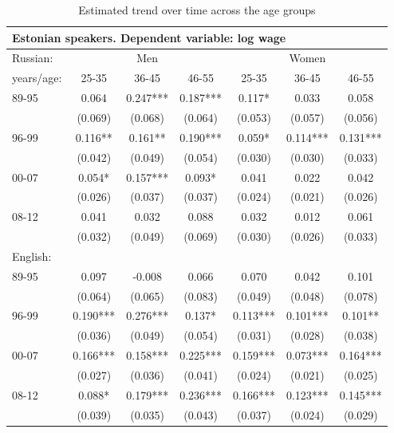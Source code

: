 \documentclass[12pt, a4paper]{article}
\begin{document}
\begin{table}[htbp]
	\centering
	\caption{Estimated trend over time across the age groups}
	\begin{tabular}{lccc|cc c}
          \toprule
		\multicolumn{7}{l}{Estonian speakers. Dependent variable: log wage}          \\ \hline
		Russian:   &    \multicolumn{3}{c|}{Men}    &   \multicolumn{3}{c}{Women}    \\
		years/age: & 25-35    & 36-45    & 46-55    & 25-35    & 36-45    & 46-55    \\ \midrule
		89-95      & 0.064    & 0.247*** & 0.187*** & 0.117*   & 0.033    & 0.058    \\
		           & (0.069)  & (0.068)  & (0.064)  & (0.053)  & (0.057)  & (0.056)  \\
		96-99      & 0.116**  & 0.161**  & 0.190*** & 0.059*   & 0.114*** & 0.131*** \\
		           & (0.042)  & (0.049)  & (0.054)  & (0.030)  & (0.030)  & (0.033)  \\
		00-07      & 0.054*   & 0.157*** & 0.093*   & 0.041    & 0.022    & 0.042    \\
		           & (0.026)  & (0.037)  & (0.037)  & (0.024)  & (0.021)  & (0.026)  \\
		08-12      & 0.041    & 0.032    & 0.088    & 0.032    & 0.012    & 0.061    \\
		           & (0.032)  & (0.049)  & (0.069)  & (0.030)  & (0.026)  & (0.033)  \\ \hline
		English:   &          &          &          &          &          &          \\
		89-95      & 0.097    & -0.008   & 0.066    & 0.070    & 0.042    & 0.101    \\
		           & (0.064)  & (0.065)  & (0.083)  & (0.049)  & (0.048)  & (0.078)  \\
		96-99      & 0.190*** & 0.276*** & 0.137*   & 0.113*** & 0.101*** & 0.101**  \\
		           & (0.036)  & (0.049)  & (0.054)  & (0.031)  & (0.028)  & (0.038)  \\
		00-07      & 0.166*** & 0.158*** & 0.225*** & 0.159*** & 0.073*** & 0.164*** \\
		           & (0.027)  & (0.036)  & (0.041)  & (0.024)  & (0.021)  & (0.025)  \\
		08-12      & 0.088*   & 0.179*** & 0.236*** & 0.166*** & 0.123*** & 0.145*** \\
		           & (0.039)  & (0.035)  & (0.043)  & (0.037)  & (0.024)  & (0.029)  \\ 

\end{tabular}
\end{table}
\end{document}
